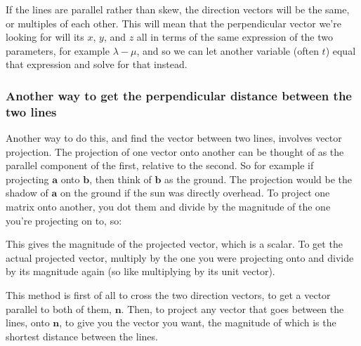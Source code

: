 If the lines are parallel rather than skew, the direction vectors will be the same, or multiples of each other. This will mean that the perpendicular vector we're looking for will its $x$, $y$, and $z$ all in terms of the same expression of the two parameters, for example $\lambda - \mu$, and so we can let another variable (often $t$) equal that expression and solve for that instead.

\subsubsection{Another way to get the perpendicular distance between the two lines}
Another way to do this, and find the vector between two lines, involves vector projection. The projection of one vector onto another can be thought of as the parallel component of the first, relative to the second. So for example if projecting $\mathbf{a}$ onto $\mathbf{b}$, then think of $\mathbf{b}$ as the ground. The projection would be the shadow of $\mathbf{a}$ on the ground if the sun was directly overhead. To project one matrix onto another, you dot them and divide by the magnitude of the one you're projecting on to, so:
\begin{ea}
\end{ea}
This gives the magnitude of the projected vector, which is a scalar. To get the actual projected vector, multiply by the one you were projecting onto and divide by its magnitude again (so like multiplying by its unit vector).

This method is first of all to cross the two direction vectors, to get a vector parallel to both of them, $\mathbf{n}$. Then, to project any vector that goes between the lines, onto $\mathbf{n}$, to give you the vector you want, the magnitude of which is the shortest distance between the lines.

